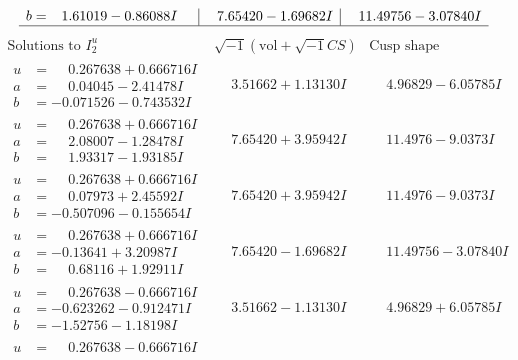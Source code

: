 \documentclass[1p]{elsarticle_modified}
\theoremstyle{definition}
\newcommand{\I}{\sqrt{-1}}
\begin{document}
$$\begin{array}{c|c|c}
\begin{aligned}
b &= \phantom{-}1.61019 - 0.86088 I\end{aligned}
 & \phantom{-}7.65420 - 1.69682 I & \phantom{-}11.49756 - 3.07840 I\\
 \hline 
 \end{array}$$\newpage$$\begin{array}{c|c|c}  
\text{Solutions to }I^u_{2}& \I (\text{vol} + \sqrt{-1}CS) & \text{Cusp shape}\\
 \hline 
\begin{aligned}
u &= \phantom{-}0.267638 + 0.666716 I \\
a &= \phantom{-}0.04045 - 2.41478 I \\
b &= -0.071526 - 0.743532 I\end{aligned}
 & \phantom{-}3.51662 + 1.13130 I & \phantom{-}4.96829 - 6.05785 I \\ \hline\begin{aligned}
u &= \phantom{-}0.267638 + 0.666716 I \\
a &= \phantom{-}2.08007 - 1.28478 I \\
b &= \phantom{-}1.93317 - 1.93185 I\end{aligned}
 & \phantom{-}7.65420 + 3.95942 I & \phantom{-}11.4976 - 9.0373 I \\ \hline\begin{aligned}
u &= \phantom{-}0.267638 + 0.666716 I \\
a &= \phantom{-}0.07973 + 2.45592 I \\
b &= -0.507096 - 0.155654 I\end{aligned}
 & \phantom{-}7.65420 + 3.95942 I & \phantom{-}11.4976 - 9.0373 I \\ \hline\begin{aligned}
u &= \phantom{-}0.267638 + 0.666716 I \\
a &= -0.13641 + 3.20987 I \\
b &= \phantom{-}0.68116 + 1.92911 I\end{aligned}
 & \phantom{-}7.65420 - 1.69682 I & \phantom{-}11.49756 - 3.07840 I \\ \hline\begin{aligned}
u &= \phantom{-}0.267638 - 0.666716 I \\
a &= -0.623262 - 0.912471 I \\
b &= -1.52756 - 1.18198 I\end{aligned}
 & \phantom{-}3.51662 - 1.13130 I & \phantom{-}4.96829 + 6.05785 I \\ \hline\begin{aligned}
u &= \phantom{-}0.267638 - 0.666716 I \\

\end{aligned}
\end{array}$$
\end{document}
